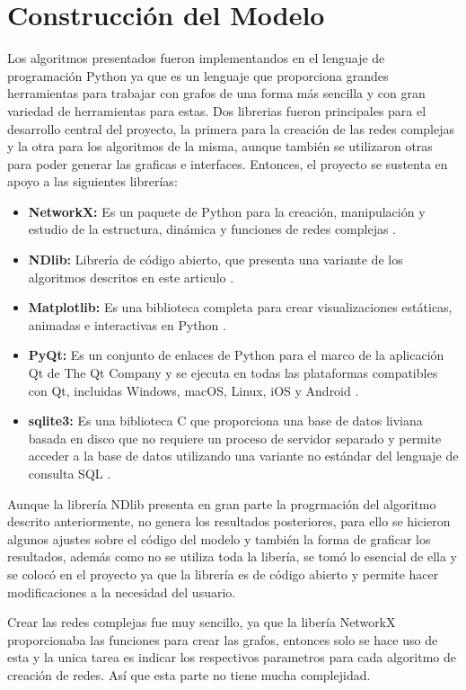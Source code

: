 \documentclass{article}
\begin{document}
\section{Construcción del Modelo}
Los algoritmos presentados fueron implementandos en el lenguaje de programación Python ya que es un lenguaje que proporciona grandes herramientas para trabajar con grafos de una forma más sencilla y con gran variedad de herramientas para estas. 
Dos librerias fueron principales para el desarrollo central del proyecto, la primera para la creación de las redes complejas y la otra para los algoritmos de la misma, aunque también se utilizaron otras para poder generar las graficas e interfaces. Entonces, el proyecto se sustenta en apoyo a las siguientes librerías:
\begin{itemize}
\item \textbf{NetworkX:} Es un paquete de Python para la creación, manipulación y estudio de la estructura, dinámica y funciones de redes complejas \cite{networkx:2020}.
\item \textbf{NDlib:} Librería de código abierto, que presenta una variante de los algoritmos descritos en este articulo \cite{ndlib:2020}. 
\item \textbf{Matplotlib:} Es una biblioteca completa para crear visualizaciones estáticas, animadas e interactivas en Python \cite{matplotlib:2020}. 
\item \textbf{PyQt:} Es un conjunto de enlaces de Python para el marco de la aplicación Qt de The Qt Company y se ejecuta en todas las plataformas compatibles con Qt, incluidas Windows, macOS, Linux, iOS y Android \cite{pyqt:2020}.
\item \textbf{sqlite3:} Es una biblioteca C que proporciona una base de datos liviana basada en disco que no requiere un proceso de servidor separado y permite acceder a la base de datos utilizando una variante no estándar del lenguaje de consulta SQL \cite{sqlite:2020}.
\end{itemize}

Aunque la librería NDlib presenta en gran parte la progrmación del algoritmo descrito anteriormente, no genera los resultados posteriores, para ello se hicieron algunos ajustes sobre el código del modelo y también la forma de graficar los resultados, además como no se utiliza toda la libería, se tomó lo esencial de ella y se colocó en el proyecto ya que la librería es de código abierto y permite hacer modificaciones a la necesidad del usuario. 

Crear las redes complejas fue muy sencillo, ya que la libería NetworkX proporcionaba las funciones para crear las grafos, entonces solo se hace uso de esta y la unica tarea es indicar los respectivos parametros para cada algoritmo de creación de redes. Así que esta parte no tiene mucha complejidad. 
\end{document}
